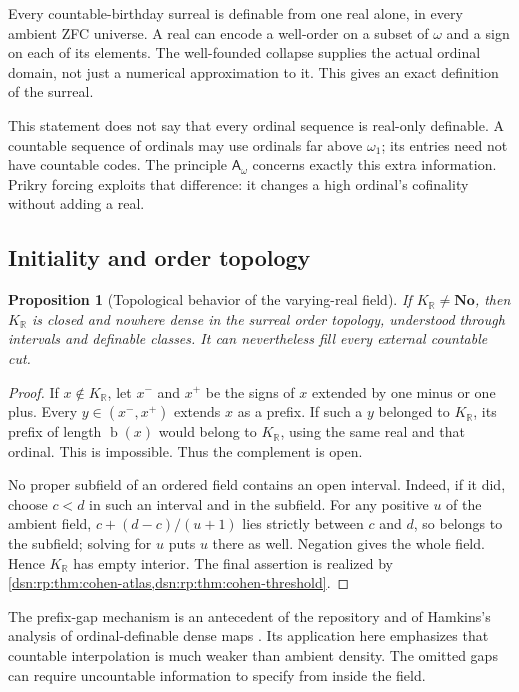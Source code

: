 \documentclass[11pt,a4paper]{article}
\numberwithin{equation}{section}
\newtheorem{proposition}[proposition]{Proposition}
\theoremstyle{definition}
\theoremstyle{remark}
\newcommand{\No}{\mathbf{No}}
\newcommand{\R}{\mathbb R}
\newcommand{\bd}{\operatorname{b}}
\newcommand{\KR}{K_{\R}}
\newcommand{\Asm}{\mathsf A_{\omega}}
\begin{document}
Every countable-birthday surreal is definable from one real alone, in
every ambient ZFC universe. A real can encode a well-order on a subset
of $\omega$ and a sign on each of its elements. The well-founded
collapse supplies the actual ordinal domain, not just a numerical
approximation to it. This gives an exact definition of the surreal.

This statement does not say that every ordinal sequence is real-only
definable. A countable sequence of ordinals may use ordinals far above
$\omega_1$; its entries need not have countable codes. The principle
$\Asm$ concerns exactly this extra information. Prikry forcing exploits
that difference: it changes a high ordinal's cofinality without adding
a real.

\subsection{Initiality and order topology}

\begin{proposition}[Topological behavior of the varying-real field]
If $\KR\ne\No$, then $\KR$ is closed and nowhere dense in the
surreal order topology, understood through intervals and definable
classes. It can nevertheless fill every external countable cut.
\end{proposition}
\begin{proof}
If $x\notin\KR$, let $x^-$ and $x^+$ be the signs of $x$ extended by
one minus or one plus. Every $y\in(x^-,x^+)$ extends $x$ as a prefix.
If such a $y$ belonged to $\KR$, its prefix of length $\bd(x)$ would
belong to $\KR$, using the same real and that ordinal. This is
impossible. Thus the complement is open.

No proper subfield of an ordered field contains an open interval.
Indeed, if it did, choose $c<d$ in such an interval and in the subfield.
For any positive $u$ of the ambient field,
$c+(d-c)/(u+1)$ lies strictly between $c$ and $d$, so belongs to the
subfield; solving for $u$ puts $u$ there as well. Negation gives the
whole field. Hence $\KR$ has empty interior. The final assertion is
realized by \cref{dsn:rp:thm:cohen-atlas,dsn:rp:thm:cohen-threshold}.
\end{proof}

The prefix-gap mechanism is an antecedent of the repository and of
Hamkins's analysis of ordinal-definable dense maps
\cite{HamkinsDensity,RepoUniv}. Its application here emphasizes that
countable interpolation is much weaker than ambient density. The
omitted gaps can require uncountable information to specify from
inside the field.
\end{document}
